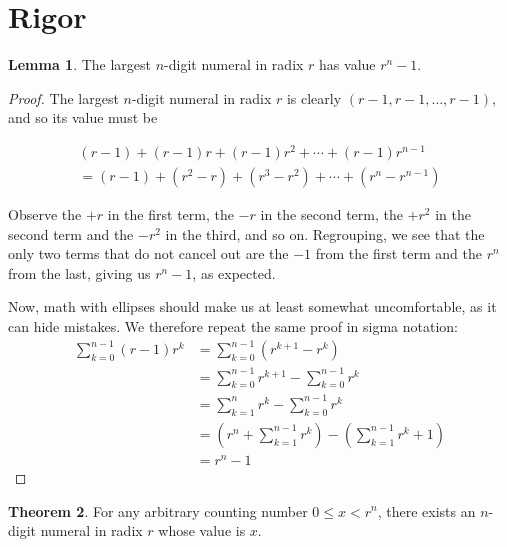 \documentclass[12pt]{article}
\theoremstyle{definition}
\newtheorem{theorem}{Theorem}[section]
\newtheorem{lemma}[theorem]{Lemma}
\begin{document}
\section{Rigor}

\begin{lemma}
  The largest $n$-digit numeral in radix $r$ has value $r^n-1$.
\end{lemma}

\begin{proof}
  The largest $n$-digit numeral in radix $r$ is clearly $(r-1, r-1,\ldots,r-1)$,
  and so its value must be

  \begin{align*}
     (r-1) + (r-1)r + (r-1)r^2 + \cdots + (r-1)r^{n-1} \\
    = (r-1) + (r^2 -r) + (r^3 -r^2) + \cdots + (r^n - r^{n-1})
  \end{align*}

  Observe the $+r$ in the first term, the $-r$ in the second term, the $+r^2$ in
the second term and the $-r^2$ in the third, and so on. Regrouping, we see that
the only two terms that do not cancel out are the $-1$ from the first term and
the $r^n$ from the last, giving us $r^n-1$, as expected.

Now, math with ellipses should make us at least somewhat uncomfortable, as it
can hide mistakes. We therefore repeat the same proof in sigma notation:
\begin{align*}
  \sum_{k=0}^{n-1}(r-1)r^k &= \sum_{k=0}^{n-1}(r^{k+1}-r^k) \\
  &= \sum_{k=0}^{n-1}r^{k+1} - \sum_{k=0}^{n-1}r^k \\
  &= \sum_{k=1}^{n}r^{k} - \sum_{k=0}^{n-1}r^k \\
  &= \left(r^n + \sum_{k=1}^{n-1}r^{k}\right) - \left(\sum_{k=1}^{n-1}r^k + 1\right) \\
  &= r^n - 1
\end{align*}
\end{proof}

\begin{theorem}
  For any arbitrary counting number $0 \leq x < r^n$, there exists an $n$-digit
numeral in radix $r$ whose value is $x$.
\end{theorem}
\end{document}
